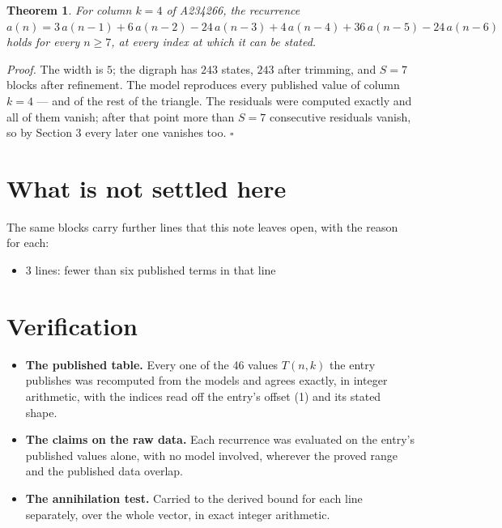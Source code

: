 \documentclass[11pt]{article}
\newtheorem{theorem}{Theorem}
\theoremstyle{definition}
\begin{document}
\begin{theorem} For column $k = 4$ of A234266, the recurrence $a(n) = 3\,a(n-1) + 6\,a(n-2) - 24\,a(n-3) + 4\,a(n-4) + 36\,a(n-5) - 24\,a(n-6)$ holds for every $n \ge 7$, at every index at which it can be stated.\end{theorem}

{\itshape Proof.} The width is $5$; the digraph has $243$ states, $243$ after trimming, and $S = 7$ blocks after refinement. The model reproduces every published value of column $k = 4$ --- and of the rest of the triangle. The residuals were computed exactly and all of them vanish; after that point more than $S = 7$ consecutive residuals vanish, so by Section 3 every later one vanishes too. $\square$

\section{What is not settled here}

The same blocks carry further lines that this note leaves open, with the reason for each:

\begin{itemize}

\item 3 lines: fewer than six published terms in that line

\end{itemize}

\section{Verification}

\begin{itemize}

\item {\bfseries The published table.} Every one of the 46 values $T(n,k)$ the entry publishes was recomputed from the models and agrees exactly, in integer arithmetic, with the indices read off the entry's offset (1) and its stated shape.

\item {\bfseries The claims on the raw data.} Each recurrence was evaluated on the entry's published values alone, with no model involved, wherever the proved range and the published data overlap.

\item {\bfseries The annihilation test.} Carried to the derived bound for each line separately, over the whole vector, in exact integer arithmetic.

\end{itemize}
\end{document}
